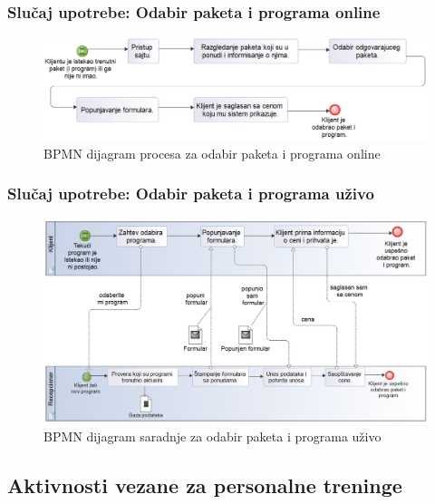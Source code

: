 \documentclass[a4paper]{article}
\begin{document}
\subsubsection{Slučaj upotrebe: Odabir paketa i programa online}

\begin{figure}[!ht]
\begin{center}
\includegraphics[scale=0.55]{sections/images/bpmn_dijagram_procesa_odabir_paketa_i_programa_online.png}
\end{center}
\caption{BPMN dijagram procesa za odabir paketa i programa online}
\label{fig:kontekst}
\end{figure}

\subsubsection{Slučaj upotrebe: Odabir paketa i programa uživo}

\begin{figure}[!ht]
\begin{center}
\includegraphics[scale=0.55]{sections/images/bpmn_dijagram_saradnje_odabir_paketa_i_programa_uzivo.png}
\end{center}
\caption{BPMN dijagram saradnje za odabir paketa i programa uživo}
\label{fig:kontekst}
\end{figure}


\newpage
\subsection{Aktivnosti vezane za personalne treninge}

\end{document}
